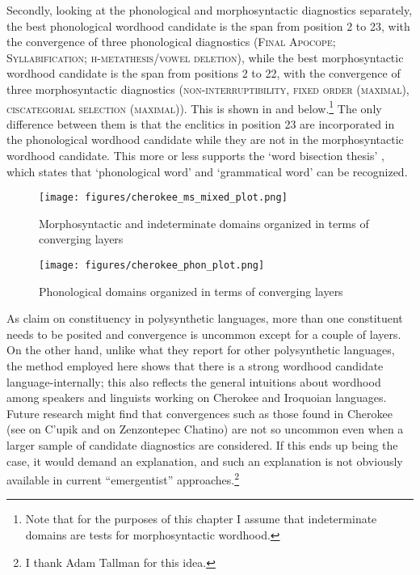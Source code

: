 \documentclass[output=paper]{langscibook}
\begin{document}
Secondly, looking at the phonological and morphosyntactic diagnostics separately, the best phonological wordhood candidate is the span from position 2 to 23, with the convergence of three phonological diagnostics (\textsc{Final} \textsc{Apocope;} \textsc{Syllabification;} \textsc{h-metathesis/vowel} \textsc{deletion}), while the best morphosyntactic wordhood candidate is the span from positions 2 to 22, with the convergence of three morphosyntactic diagnostics (\textsc{non-interruptibility,} \textsc{fixed} \textsc{order} \textsc{(maximal),} \textsc{ciscategorial} \textsc{selection} \textsc{(maximal)}). This is shown in  and  below.\footnote{Note that for the purposes of this chapter I assume that indeterminate domains are tests for morphosyntactic wordhood.} The only difference between them is that the enclitics in position 23 are incorporated in the phonological wordhood candidate while they are not in the morphosyntactic wordhood candidate. This more or less supports the `word bisection thesis' \citep[7]{Dixon2009}, which states that `phonological word' and `grammatical word' can be recognized.

\begin{figure}
    \centering
    \texttt{[image: figures/cherokee\_ms\_mixed\_plot.png]}
    \caption{Morphosyntactic and indeterminate domains organized in terms of converging layers}
    \label{fig:cherms}
\end{figure}
  
\begin{figure}
    \centering
    \texttt{[image: figures/cherokee\_phon\_plot.png]}
    \caption{Phonological domains organized in terms of converging layers}
    \label{fig:cherphon}
\end{figure}

As \citet{Bickel2017} claim on constituency in polysynthetic languages, more than one constituent needs to be posited and convergence is uncommon except for a couple of layers. On the other hand, unlike what they report for other polysynthetic languages, the method employed here shows that there is a strong wordhood candidate language-internally; this also reflects the general intuitions about wordhood among speakers and linguists working on Cherokee and Iroquoian languages. Future research might find that convergences such as those found in Cherokee (see  on C'upik and  on Zenzontepec Chatino) are not so uncommon even when a larger sample of candidate diagnostics are considered. If this ends up being the case, it would demand an explanation, and such an explanation is not obviously available in current ``emergentist'' approaches.\footnote{I thank Adam Tallman for this idea.}
\end{document}
